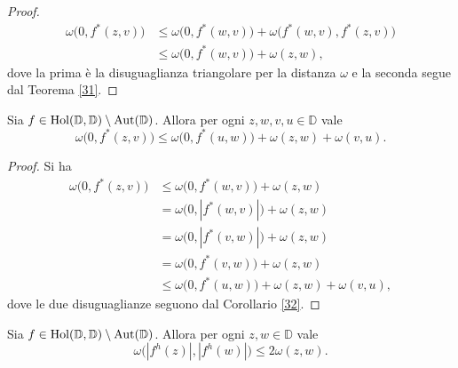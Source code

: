 \begin{proof}
  \begin{align*}
    \omega\bigl(0,f^*(z,v)\bigr) & \le \omega\bigl(0,f^*(w,v)\bigr)+\omega\bigl(f^*(w,v),f^*(z,v)\bigr) \\
    & \le \omega\bigl(0,f^*(w,v)\bigr)+\omega(z,w),
  \end{align*}
  dove la prima è la disuguaglianza triangolare per la distanza $\omega$ e la seconda segue dal Teorema \ref{31}.
\end{proof}

\begin{cor} \label{33}
  Sia $f \in \text{\normalfont{Hol}}(\mathbb{D},\mathbb{D})\setminus\text{\normalfont{Aut}}(\mathbb{D})$. Allora per ogni $z, w, v, u \in \mathbb{D}$ vale
  \begin{equation}
    \omega\bigl(0, f^*(z,v)\bigr) \le \omega\bigl(0, f^*(u,w)\bigr)+\omega(z,w)+\omega(v,u).
  \end{equation}
\end{cor}

\begin{proof}
  Si ha
  \begin{align*}
    \omega\bigl(0,f^*(z,v)\bigr) & \le \omega\bigl(0,f^*(w,v)\bigr)+\omega(z,w) \\
    & =\omega\bigl(0,|f^*(w,v)|\bigr)+\omega(z,w) \\
    & =\omega\bigl(0,|f^*(v,w)|\bigr)+\omega(z,w) \\
    & =\omega\bigl(0,f^*(v,w)\bigr)+\omega(z,w) \\
    & \le \omega\bigl(0,f^*(u,w)\bigr)+\omega(z,w)+\omega(v,u),
  \end{align*}
  dove le due disuguaglianze seguono dal Corollario \ref{32}.
\end{proof}

\begin{cor} \label{quasigolusin}
  Sia $f \in \text{\normalfont{Hol}}(\mathbb{D},\mathbb{D})\setminus\text{\normalfont{Aut}}(\mathbb{D})$. Allora per ogni $z, w \in \mathbb{D}$ vale
  \begin{equation} \label{quasigol}
    \omega\bigl(|f^h(z)|, |f^h(w)|\bigr) \le 2\omega(z,w).
  \end{equation}
\end{cor}

